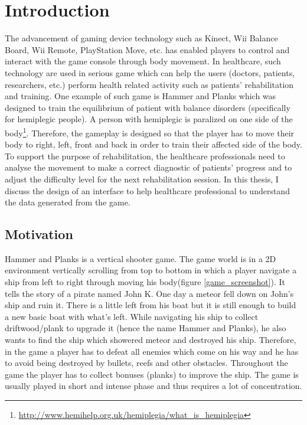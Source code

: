 \chapter{Introduction}
\label{chap:intro}

The advancement of gaming device technology such as Kinect, Wii Balance Board, Wii Remote, PlayStation Move, etc. has enabled players to control and interact with the game console through body movement. In healthcare, such technology are used in serious game which can help the users (doctors, patients, researchers, etc.)  perform health related activity such as patients' rehabilitation and training\cite{rahman,brezinka,green}. One example of such game is Hammer and Planks which was designed to train the equilibrium of patient with balance disorders (specifically for hemiplegic people)\cite{diloreto}. A person with hemiplegic is paralized on one side of the body\footnote{\url{http://www.hemihelp.org.uk/hemiplegia/what_is_hemiplegia}}. Therefore, the gameplay is designed so that the player has to move their body to right, left, front and back in order to train their affected side of the body. To support the purpose of rehabilitation, the healthcare professionals need to analyse the movement to  make a correct diagnostic of patients' progress and to adjust the difficulty level for the next rehabilitation session. In this thesis, I discuss the design of an interface to help healthcare professional to understand the data generated from the game.

\section{Motivation}

Hammer and Planks is a vertical shooter game. The game world is in a 2D environment vertically scrolling from top to bottom in which a player navigate a ship from left to right through moving his body(figure \ref{game_screenshot}). It tells the story of a pirate named John K. One day a meteor fell down on John's ship and ruin it. There is a little left from his boat but it is still enough to build a new basic boat with what's left. While navigating his ship to collect driftwood/plank to upgrade it (hence the name Hammer and Planks), he also wants to find the ship which showered meteor and destroyed his ship. Therefore, in the game a player has to defeat all enemies which come on his way and he has to avoid being destroyed by bullets, reefs and other obstacles. Throughout the game the player has to collect bonuses (planks) to improve the ship. The game is usually played in short and intense phase and thus requires a lot of concentration\cite{diloreto}.

